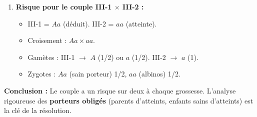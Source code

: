 \documentclass[11pt]{article}
\begin{document}
\begin{exoresolu}
\begin{enumerate}
\begin{itemize}
                  \item \textbf{II-1 ép (époux de II-1, sain, enfant III-1 sain) :} Pas d'enfant atteint $\rightarrow$ génotype indéterminé ($AA$ ou $Aa$). Noté \textbf{$A-$}.
                  \item \textbf{III-1 (sain, parents $Aa \times A-$) :} A reçu $a$ de II-1. Pour être sain, a reçu $A$ de l'autre parent. Donc III-1 = \textbf{$Aa$ (porteur)}.
                  \item \textbf{II-2 ($Aa$) $\times$ II-3 ($Aa$) (consanguins frère/sœur) :} Croisement $Aa \times Aa$.
                  \item \textbf{III-2 (atteinte) :} \textbf{$aa$}. Cohérent (probabilité 1/4).
                  \item \textbf{II-4 ($aa$) $\times$ II-4 ép (sain, enfant III-3 sain) :} II-4 transmet $a$. III-3 sain $\rightarrow$ a reçu $A$ du père. Donc II-4 ép = \textbf{$Aa$ (porteur obligé)}. III-3 = \textbf{$Aa$}.
              \end{itemize}
        \item \textbf{Risque pour le couple III-1 $\times$ III-2 :}
              \begin{itemize}
                  \item III-1 = $Aa$ (déduit). III-2 = $aa$ (atteinte).
                  \item Croisement : $Aa \times aa$.
                  \item Gamètes : III-1 $\rightarrow$ $A$ (1/2) ou $a$ (1/2). III-2 $\rightarrow$ $a$ (1).
                  \item Zygotes : $Aa$ (sain porteur) 1/2, $aa$ (albinos) 1/2.
              \end{itemize}
    \end{enumerate}
    \begin{center}
    \end{center}
    \textbf{Conclusion :} Le couple a un risque sur deux à chaque grossesse. L'analyse rigoureuse des \textbf{porteurs obligés} (parents d'atteints, enfants sains d'atteints) est la clé de la résolution.
\end{exoresolu}
\end{document}
